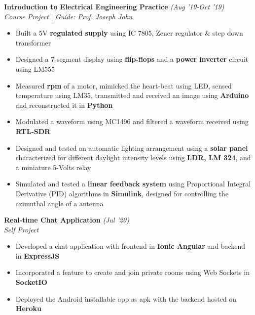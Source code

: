 \documentclass{article}
\begin{document}
\newpage


\raggedright

\vspace{-5pt}





\large\textbf{Introduction to Electrical Engineering Practice} \hfill{ \textit{(Aug '19-Oct '19)}}
\large \\  \textit{Course Project} | \textit{Guide: Prof. Joseph John}

\vspace{-6pt}

\begin{itemize}[itemsep=-1mm, leftmargin=18pt]
	\item Built a 5V \textbf{regulated supply} using IC 7805, Zener regulator \& step down transformer
	\item Designed a 7-segment display using \textbf{flip-flops} and a \textbf{power inverter} circuit using LM555
	\item Measured \textbf{rpm} of a motor, mimicked the heart-beat using LED, sensed temperature using LM35, transmitted and received an image using \textbf{Arduino} and reconstructed it in \textbf{Python}
	\item Modulated a waveform using MC1496 and filtered a waveform received using \textbf{RTL-SDR}
	\item Designed and tested an automatic lighting arrangement using a \textbf{solar panel} characterized for different daylight intensity levels using \textbf{LDR, LM 324}, and a miniature 5-Volts relay
	\item Simulated and tested a \textbf{linear feedback system} using Proportional Integral Derivative (PID) algorithms in \textbf{Simulink}, designed for controlling the azimuthal angle of a antenna
\end{itemize}


\raggedright



\large\textbf{Real-time Chat Application} \hfill{ \textit{(Jul '20)}}
\large \\  \textit{Self Project}

\vspace{-6pt}

\begin{itemize}[itemsep=-1mm, leftmargin=18pt]
	\item Developed a chat application with frontend in \textbf{Ionic Angular} and backend in \textbf{ExpressJS}
	\item Incorporated a feature to create and join private rooms using Web Sockets in \textbf{SocketIO}  
	\item Deployed the Android installable app as apk with the backend hosted on \textbf{Heroku}
\end{itemize}
\end{document}
